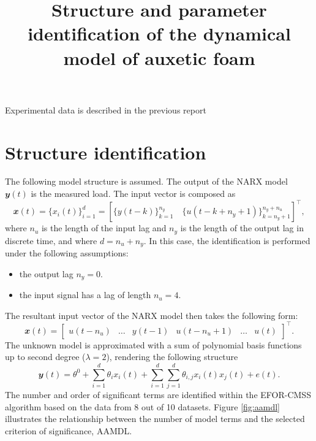 \documentclass[a4paper,11pt,twoside]{article}
\title{Structure and parameter identification of the dynamical model of auxetic foam}
\def\ny{0}
\def\nu{4}
\def\order{2}
\theoremstyle{mytheoremstyle}
\begin{document}
	\maketitle
\par Experimental data is described in the previous report
\section{Structure identification}
\par The following model structure is assumed. The output of the NARX model $\mathbfit{y}(t)$ is the measured load. The input vector is composed as
\begin{equation}
	\mathbfit{x}(t) = \{x_i(t)\}^{d}_{i=1} = \left[\{y(t - k)\}^{n_y}_{k=1} \quad \{u(t - k + n_y + 1)\}^{n_y + n_u}_{k= n_y + 1} \right]^{\top},
\end{equation}
where $n_u$ is the length of the input lag and $n_y$ is the length of the output lag in discrete time, and where $d = n_u + n_y$. In this case, the identification is performed under the following assumptions:
\begin{itemize}[noitemsep,topsep=0.3pt,parsep=0.3pt,partopsep=0.2pt,labelindent=1cm] 
	\item the output lag $n_y =\ny$.
	\item the input signal has a lag of length $n_u = \nu$.
\end{itemize}
The resultant input vector of the NARX model then takes the following form:
\begin{equation}
\mathbfit{x}(t) = \left[\begin{array}{cccccc}
u(t-n_u) & \dots & y(t-1) & u(t-n_u+1) & \dots & u(t)
\end{array}\right]^{\top}.
\end{equation}
The unknown model is approximated with a sum of polynomial basis functions up to second degree ($\lambda = \order$), rendering the following structure
\begin{equation}\label{eq:narx}
	\mathbfit{y}(t) = \theta^0 + \sum_{i=1}^{d} \theta_i x_i(t) + \sum_{i=1}^{d} \sum_{j=1}^{d} \theta_{i,j} x_i(t) x_j(t) + e(t).
\end{equation}
The number and order of significant terms are identified within the EFOR-CMSS algorithm based on the data from 8 out of 10 datasets. Figure \ref{fig:aamdl} illustrates the relationship between the number of model terms and the selected criterion of significance, AAMDL.
\end{document}
